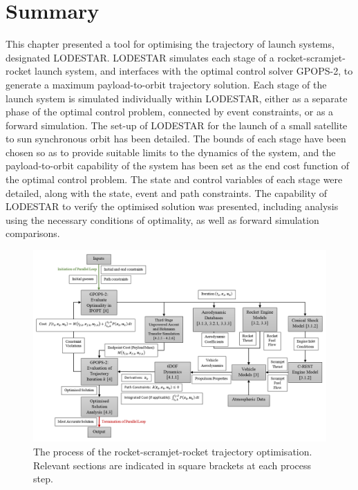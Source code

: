 \section{Summary}
This chapter presented a tool for optimising the trajectory of launch systems, designated LODESTAR. 
LODESTAR simulates each stage of a rocket-scramjet-rocket launch system, and interfaces with the optimal control solver GPOPS-2, to generate a maximum payload-to-orbit trajectory solution. 
Each stage of the launch system is simulated individually within LODESTAR, either as a separate phase of the optimal control problem, connected by event constraints, or as a forward simulation. 
The set-up of LODESTAR for the launch of a small satellite to sun synchronous orbit has been detailed. 
The bounds of each stage have been chosen so as to provide suitable limits to the dynamics of the system, and the payload-to-orbit capability of the system has been set as the end cost function of the optimal control problem. 
The state and control variables of each stage were detailed, along with the state, event and path constraints.
The capability of LODESTAR to verify the optimised solution was presented, including analysis using the necessary conditions of optimality, as well as forward simulation comparisons.


\begin{landscape}%
	\begin{figure}[ht]
		\centering
		\includegraphics[width=0.98\linewidth]{"figures/4_LODESTAR/Ascent Flowchart"}
		\caption{The process of the rocket-scramjet-rocket trajectory optimisation. Relevant sections are indicated in square brackets at each process step.}
		\label{fig:AscentFlowchart}
	\end{figure} 
\end{landscape}
